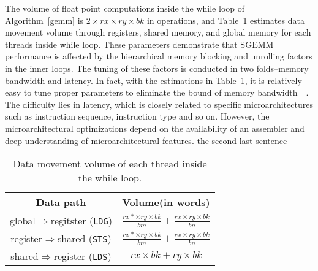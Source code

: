The volume of float point computations inside the while loop of Algorithm~\ref{gemm} is $2\times rx\times ry \times bk$ 
in operations, and Table~\ref{tab:dm} estimates data movement volume through registers, shared memory, and global 
memory for each threads inside while loop.
These parameters demonstrate that SGEMM performance is affected by the hierarchical memory blocking and unrolling 
factors in the inner loops.
The tuning of these factors is conducted in two folds--memory bandwidth and latency. In fact, with the estimations in 
Table~\ref{tab:dm}, it is relatively easy to tune proper parameters to eliminate the bound of memory 
bandwidth~\cite{magma}~\cite{tan}. The difficulty lies in latency, which is closely related to specific 
microarchitectures such as instruction sequence, instruction type and so on. However, the microarchitectural 
optimizations depend on the availability of an assembler and deep understanding of microarchitectural features. %
the second last sentence

\begin{table}[!t]
    \caption{Data movement volume of each thread inside the while loop.} %
\centering
\scalebox{1.0} {
\begin{tabular}{|c|c|}
\hline
    Data path& Volume(in words)\\
\hline
    global$\Rightarrow$regitster ({\tt LDG})& $\frac{rx*\times ry \times bk}{bm} + \frac{rx\times ry \times bk}{bn}$ \\
\hline
register$\Rightarrow$shared ({\tt STS})& $\frac{rx*\times ry \times bk}{bm} + \frac{rx\times ry \times bk}{bn}$ \\
\hline
shared$\Rightarrow$register ({\tt LDS})& $rx\times bk + ry\times bk$\\
\hline
\end{tabular}
}
\label{tab:dm}
\end{table}
